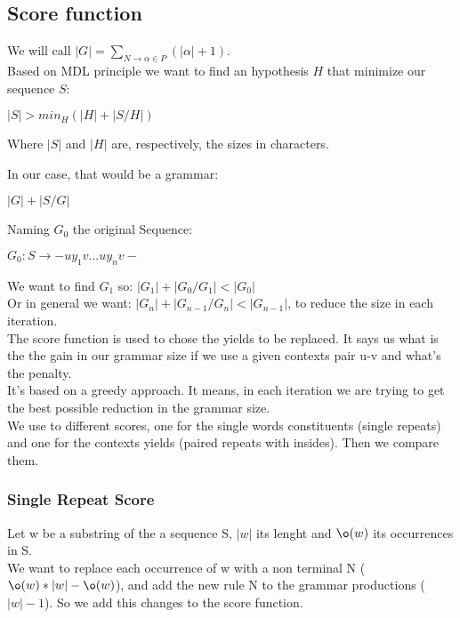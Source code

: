 \newpage

\subsection{Score function}

We will call $|G| = \sum_{N \rightarrow \alpha \in P}(|\alpha|+1)$. \\

Based on MDL principle \cite[p. 8]{GThesis} we want to find an hypothesis $H$ that minimize our sequence $S$:
\begin{center}
$|S| > min_H(|H| + |S/H|)$
\end{center} 

Where $|S|$ and $|H|$ are, respectively, the sizes in characters.

In our case, that would be a grammar:
\begin{center}
$|G| + |S/G|$
\end{center} 


Naming $G_{0}$ the original Sequence:
\begin{center}
 $G_{0}: S \rightarrow -uy_{1}v ... uy_{n}v-$
\end{center}

We want to find $G_{1}$ so: $|G_{1}|+|G_{0}/G_{1}|<|G_{0}|$\\

Or in general we want: $|G_{n}|+|G_{n-1}/G_{n}|<|G_{n-1}|$, to reduce the size
in each iteration. \\

The score function is used to chose the yields to be replaced. 
It says us what is the the gain in our grammar size if we
use a given contexts pair u-v and what's the penalty. \\

It's based on a greedy approach. It means, in each
iteration we are trying to get the best possible reduction in the grammar size. \\

We use to different scores, one for the single 
words constituents (single repeats) and one for the contexts yields (paired repeats with insides). Then we compare them. \\ 

\subsubsection{Single Repeat Score}

\indent Let w be a substring of the a sequence S, $|w|$ its lenght and $\o(w)$ its occurrences in S. \\
We want to replace each occurrence of w with a non terminal N ($\o(w)*|w| - \o(w)$), and add the new rule N
to the grammar productions ($|w| - 1$). So we add this changes to the score function. \\

